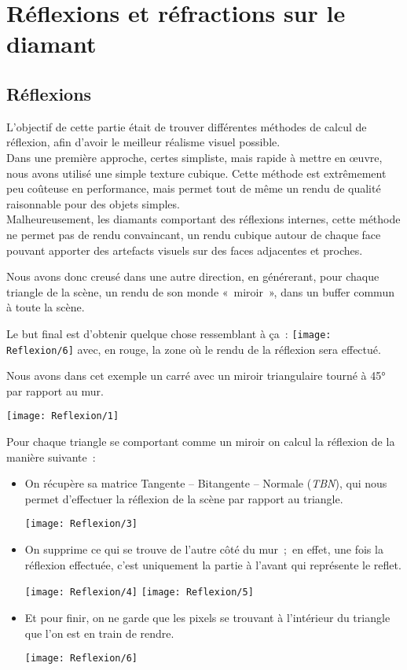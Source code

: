 \section{Réflexions et réfractions sur le diamant}

\subsection{Réflexions}

L'objectif de cette partie était de trouver  différentes méthodes
de calcul de réflexion, afin d'avoir le meilleur réalisme visuel possible. \\

Dans une première approche, certes simpliste, mais rapide à mettre en œuvre,
nous avons utilisé une simple texture cubique. Cette méthode est extrêmement peu
coûteuse en performance, mais permet tout de même un rendu de qualité raisonnable
pour des objets simples. \\
Malheureusement, les diamants comportant des réflexions internes, cette méthode ne permet pas
de rendu convaincant, un rendu cubique autour de chaque face pouvant apporter des artefacts
visuels sur des faces adjacentes et proches.

Nous avons donc creusé dans une autre direction, en générerant, pour chaque triangle de la scène,
un rendu de son monde «~miroir~», dans un buffer commun à toute la scène.

Le but final est d'obtenir quelque chose ressemblant à ça~:
\texttt{[image: Reflexion/6]}
avec, en rouge, la zone où le rendu de la réflexion sera effectué.

Nous avons dans cet exemple un carré avec un miroir triangulaire tourné à 45° par rapport au mur.

\texttt{[image: Reflexion/1]}

Pour chaque triangle se comportant comme un miroir on calcul la réflexion de la manière suivante~:

\begin{itemize}
    \item On récupère sa matrice Tangente – Bitangente – Normale (\textit{TBN}), qui nous permet
        d'effectuer la réflexion de la scène par rapport au triangle.

        \texttt{[image: Reflexion/3]}

    \item On supprime ce qui se trouve de l'autre côté du mur ; en effet, une
        fois la réflexion effectuée, c'est uniquement la partie à l'avant qui
        représente le reflet.

        \texttt{[image: Reflexion/4]}
        \texttt{[image: Reflexion/5]}
    \item Et pour finir, on ne garde que les pixels se trouvant à l'intérieur
        du triangle que l'on est en train de rendre.

        \texttt{[image: Reflexion/6]}
\end{itemize}

